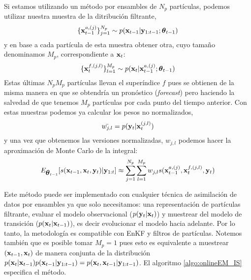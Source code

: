 Si estamos utilizando un método por ensambles de $N_p$ partículas, podemos utilizar nuestra muestra de la ditribución filtrante,
\begin{align*}
    \{ \mathbf{x}_{t-1}^{a, (j)}\}_{j=1}^{N_p} \sim p(\mathbf{x}_{t-1} | \mathbf{y}_{1:t-1} ; \mbox{\boldmath$ \theta $}_{t-1})
\end{align*}
y en base a cada partícula de esta muestra obtener otra, cuyo tamaño denominamos $M_p$, correspondiente a $\mathbf{x}_t$:
\begin{align*}
    \{ \mathbf{x}_{t}^{f, (j,l)}\}_{l=1}^{M_p} \sim p(\mathbf{x}_t | \mathbf{x}_{t-1}^{a, (j)} ; \mbox{\boldmath$ \theta $}_{t-1})
\end{align*}
Estas últimas $N_p M_p$ partículas llevan el superíndice $f$ pues se obtienen de la misma manera en que se obtendría un pronóstico (\textit{forecast}) pero haciendo la salvedad de que tenemos $M_p$ partículas por cada punto del tiempo anterior. Con estas muestras podemos ya calcular los pesos no normalizados,
\begin{align*}
    \bar{w_{j,l}} = p(\mathbf{y}_t | \mathbf{x}_t^{(j,l)})
\end{align*}
y una vez que obtenemos las versiones normalizadas, $w_{j,l}$ podemos hacer la aproximación de Monte Carlo de la integral:
\begin{align*}
    E_{\mbox{\boldmath$ \theta $}_{t-1}} [s(\mathbf{x}_{t-1}, \mathbf{x}_t, \mathbf{y}_t) | \mathbf{y}_{1:t}] \approx \sum_{j=1}^{N_p} \sum_{l=1}^{M_p} w_{j, l} s(\mathbf{x}_{t-1}^{a, (j)}, \mathbf{x}_{t}^{f, (j,l)}, \mathbf{y}_t)
\end{align*}

Este método puede ser implementado con cualquier técnica de asimilación de datos por ensambles ya que solo necesitamos: una representación de partículas filtrante, evaluar el modelo observacional ($p(\mathbf{y}_t | \mathbf{x}_t)$) y muestrear del modelo de transición ($p(\mathbf{x}_t | \mathbf{x}_{t-1})$), es decir evolucionar el modelo hacia adelante. Por lo tanto, la metodología es compatible con EnKF y filtros de partículas. Notemos también que  es posible tomar $M_p = 1$ pues esto es equivalente a muestrear $(\mathbf{x}_{t-1}, \mathbf{x}_t)$ de manera conjunta de la distribución $p(\mathbf{x}_t | \mathbf{x}_{t-1}) p(\mathbf{x}_{t-1} | \mathbf{y}_{1:t-1}) = p(\mathbf{x}_t, \mathbf{x}_{t-1} | \mathbf{y}_{1:t-1})$. El algoritmo \ref{algo:onlineEM_IS} especifica el método.

